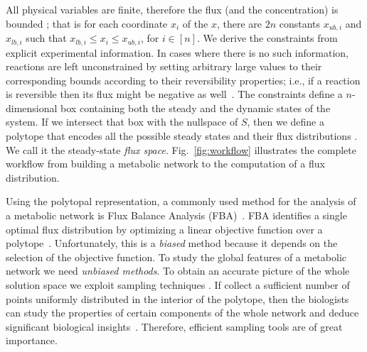 
   All physical variables are finite, therefore  the flux (and the concentration)
   is bounded  \cite{palsson2015systems}; that is
   for each coordinate $x_i$ of the $x$, there are $2n$ constants
   $x_{ub, i}$ and  $x_{lb, i}$
   such that  $x_{lb,i} \le x_i \le x_{ub, i}$, for $i  \in [n]$.
   We derive the constraints from explicit experimental information.
   In cases where there is no such information, reactions are left unconstrained by
   setting arbitrary large values to their corresponding bounds according to their reversibility properties; i.e., if a reaction is reversible then its flux might be negative as well~\cite{lularevic2019improving}.
   The constraints define a $n$-dimensional box
   containing both the steady and the dynamic states of the system.
   If we intersect that box with the nullspace of
   $S$, then we define a polytope that encodes all the possible steady
   states and their  flux distributions \cite{palsson2015systems}.
   We call it the  steady-state \emph{flux space}.
   Fig.~\ref{fig:workflow} illustrates the complete workflow from building a metabolic network to the computation of a flux distribution.
   
   Using the polytopal representation, a commonly used method for the analysis of a metabolic network is Flux Balance Analysis (FBA)~\cite{orth2010flux}.
   FBA identifies a single optimal flux distribution by optimizing a linear objective function over a polytope~\cite{orth2010flux}. Unfortunately, this is a \textit{biased} method because it depends on the  selection of the objective function.
   To study the  global features of a metabolic network we need \emph{unbiased methods}. To obtain  an accurate picture of the whole solution space we exploit sampling techniques \cite{schellenberger2009use}.
   If collect a sufficient number of points uniformly distributed in the interior of the polytope, then the biologists can study the properties of certain components of the whole network and deduce significant biological insights~\cite{palsson2015systems}. Therefore, efficient sampling tools are of great importance.
   

